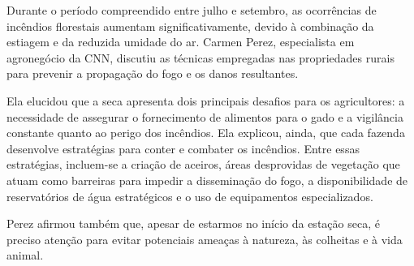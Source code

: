 \begin{myquote}




Durante o período compreendido entre julho e setembro, as ocorrências de
incêndios florestais aumentam significativamente, devido à combinação da
estiagem e da reduzida umidade do ar. Carmen Perez, especialista em
agronegócio da CNN, discutiu as técnicas empregadas nas propriedades rurais
para prevenir a propagação do fogo e os danos resultantes.

Ela elucidou que a seca apresenta dois principais desafios para os
agricultores: a necessidade de assegurar o fornecimento de alimentos para o
gado e a vigilância constante quanto ao perigo dos incêndios. Ela explicou,
ainda, que cada fazenda desenvolve estratégias para conter e combater
os incêndios. Entre essas estratégias, incluem-se a criação de aceiros, áreas
desprovidas de vegetação que atuam como barreiras para impedir a disseminação
do fogo, a disponibilidade de reservatórios de água estratégicos e o uso de
equipamentos especializados.

Perez afirmou também que, apesar de estarmos no início da estação seca, é preciso atenção
para evitar potenciais ameaças à natureza, às colheitas e à vida animal.


\end{myquote}

